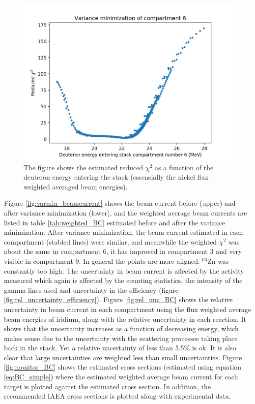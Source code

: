 \begin{figure}
    \centering
    \includegraphics{Analysis/chisquared_comp6.png}
    \caption{The figure shows the estimated reduced $\chi^2$ as a function of the deuteron energy entering the stack (essensially the nickel flux weighted averaged beam energies).}
    \label{fig:chisq_curve}
\end{figure}

\noindent
Figure \ref{fig:varmin_beamcurrent} shows the beam current before (upper) and after variance minimization (lower), and the weighted average beam currents are listed in table \ref{tab:weighted_BC} estimated before and after the variance minimization. After variance minimization, the beam current estimated in each compartment (stabled lines) were similar, and meanwhile the weighted $\chi^2$ was about the same in compartment 6, it has improved in compartment 3 and very visible in compartment 9. In general the points are more aligned. $^{63}$Zn was constantly too high. The uncertainty in beam current is affected by the activity measured which again is affected by the counting statistics, the intensity of the gamma-lines used and uncertainty in the efficiency (figure \ref{fig:rel_uncertainty_efficiency}). Figure \ref{fig:rel_unc_BC} shows the relative uncertainty in beam current in each compartment using the flux weighted average beam energies of iridium, along with the relative uncertainty in each reaction. It shows that the uncertainty increases as a function of decreasing energy, which makes sense due to the uncertainty with the scattering processes taking place back in the stack. Yet a relative uncertainty of less than 5.5\% is ok. It is also clear that large uncertainties are weighted less than small uncertainties. Figure \ref{fig:monitor_BC} shows the estimated cross sections (estimated using equation \ref{eq:BC_simple}) where the estimated weighted average beam current for each target is plotted against the estimated cross section. In addition, the recommended IAEA cross sections \cite{Hermanne2018a} is plotted along with experimental data.


